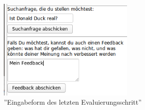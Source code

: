 \begin{figure}
\centering
\includegraphics[width=0.6\textwidth]{Bilder/ende-eval-01.png}
\caption{''Eingabeform des letzten Evaluierungsschritt''}
\label{fig:finish-eval}
\end{figure}
